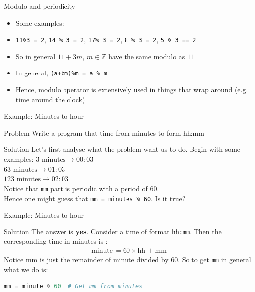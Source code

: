 \documentclass[10pt,xcolor={table,dvipsnames},t]{beamer}
\begin{document}
\begin{frame}{Modulo and periodicity}
  \begin{itemize}
    \item Some examples:
    \item \texttt{11\%3 = 2}, \texttt{14 \% 3 = 2}, \texttt{17\% 3 = 2}, \texttt{8 \% 3 = 2}, \texttt{5 \% 3 == 2}
    \item So in general $11+3m$, $m\in\mathbb{Z}$ have the same modulo as $11$ 
    \item In general, \texttt{(a+bm)\%m = a \% m}
    \item Hence, modulo operator is extensively used in things that wrap around (e.g. time around the clock)
  \end{itemize}
\end{frame}

\begin{frame}[fragile]{Example: Minutes to hour}
  \begin{exampleblock}{Problem}
    Write a program that time from minutes to form hh:mm
  \end{exampleblock}
  \begin{exampleblock}{Solution}
    Let's first analyse what the problem want us to do. Begin with some examples:
    $3 \text{ minutes} \to 00:03$\\
    $63 \text{ minutes} \to 01:03$\\
    $123 \text{ minutes} \to 02:03$\\
    Notice that \texttt{mm} part is periodic with a period of 60.\\ Hence one might guess that \texttt{mm = minutes \% 60}. Is it true?
  \end{exampleblock}
\end{frame}

\begin{frame}[fragile]{Example: Minutes to hour}
  \begin{exampleblock}{Solution}
    The answer is \textbf{yes}. Consider a time of format \texttt{hh:mm}. Then the corresponding time in minutes is :
    \begin{align*}
      \text{minute}\, = 60\times \text{hh}\, + \text{mm}
    \end{align*}
    Notice $\text{mm}$ is just the remainder of $\text{minute}$ divided by 60. So to get \texttt{mm} in general what we do is:
\begin{lstlisting}[language=python]
mm = minute % 60  # Get mm from minutes
\end{lstlisting}
  \end{exampleblock}
\end{frame}
\end{document}
